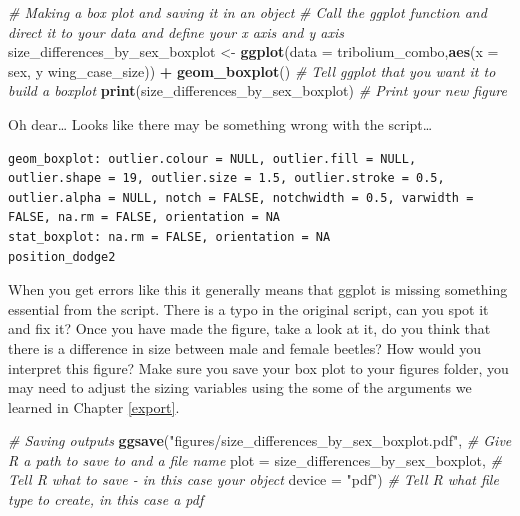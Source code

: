 \documentclass[
]{book}
\newenvironment{Shaded}{\begin{snugshade}}{\end{snugshade}}
\newcommand{\AttributeTok}[1]{\textcolor[rgb]{0.13,0.29,0.53}{#1}}
\newcommand{\CommentTok}[1]{\textcolor[rgb]{0.56,0.35,0.01}{\textit{#1}}}
\newcommand{\FunctionTok}[1]{\textcolor[rgb]{0.13,0.29,0.53}{\textbf{#1}}}
\newcommand{\NormalTok}[1]{#1}
\newcommand{\OtherTok}[1]{\textcolor[rgb]{0.56,0.35,0.01}{#1}}
\newcommand{\SpecialCharTok}[1]{\textcolor[rgb]{0.81,0.36,0.00}{\textbf{#1}}}
\newcommand{\StringTok}[1]{\textcolor[rgb]{0.31,0.60,0.02}{#1}}
\begin{document}
\begin{Shaded}
\begin{Highlighting}[]
\CommentTok{\# Making a box plot and saving it in an object}
\CommentTok{\# Call the ggplot function and direct it to your data and define your x axis and y axis}
\NormalTok{size\_differences\_by\_sex\_boxplot }\OtherTok{\textless{}{-}} \FunctionTok{ggplot}\NormalTok{(}\AttributeTok{data =}\NormalTok{ tribolium\_combo,}\FunctionTok{aes}\NormalTok{(}\AttributeTok{x =}\NormalTok{ sex, y wing\_case\_size)) }\SpecialCharTok{+} 
  \FunctionTok{geom\_boxplot}\NormalTok{() }\CommentTok{\# Tell ggplot that you want it to build a boxplot}
\FunctionTok{print}\NormalTok{(size\_differences\_by\_sex\_boxplot) }\CommentTok{\# Print your new figure}
\end{Highlighting}
\end{Shaded}

Oh dear\ldots{} Looks like there may be something wrong with the script\ldots{}

\begin{verbatim}
geom_boxplot: outlier.colour = NULL, outlier.fill = NULL, outlier.shape = 19, outlier.size = 1.5, outlier.stroke = 0.5, outlier.alpha = NULL, notch = FALSE, notchwidth = 0.5, varwidth = FALSE, na.rm = FALSE, orientation = NA
stat_boxplot: na.rm = FALSE, orientation = NA
position_dodge2 
\end{verbatim}

When you get errors like this it generally means that ggplot is missing something essential from the script. There is a typo in the original script, can you spot it and fix it? Once you have made the figure, take a look at it, do you think that there is a difference in size between male and female beetles? How would you interpret this figure? Make sure you save your box plot to your figures folder, you may need to adjust the sizing variables using the some of the arguments we learned in Chapter \ref{export}.

\begin{Shaded}
\begin{Highlighting}[]
\CommentTok{\# Saving outputs}
\FunctionTok{ggsave}\NormalTok{(}\StringTok{"figures/size\_differences\_by\_sex\_boxplot.pdf"}\NormalTok{, }\CommentTok{\# Give R a path to save to and a file name}
       \AttributeTok{plot =}\NormalTok{ size\_differences\_by\_sex\_boxplot, }\CommentTok{\# Tell R what to save {-} in this case your object}
       \AttributeTok{device =} \StringTok{"pdf"}\NormalTok{) }\CommentTok{\# Tell R what file type to create, in this case a pdf}
\end{Highlighting}
\end{Shaded}
\end{document}

